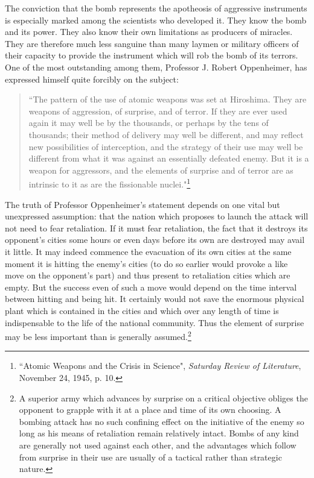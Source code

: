The conviction that the bomb represents the apotheosis of aggressive instruments is especially marked among the scientists who developed it. They know the bomb and its power. They also know their own limitations as producers of miracles. They are therefore much less sanguine than many laymen or military officers of their capacity to provide the instrument which will rob the bomb of its terrors. One of the most outstanding among them, Professor J. Robert Oppenheimer, has expressed himself quite forcibly on the subject:

\begin{quote}
``The pattern of the use of atomic weapons was set at Hiroshima. They are weapons of aggression, of surprise, and of terror. If they are ever used again it may well be by the thousands, or perhaps by the tens of thousands; their method of delivery may well be different, and may reflect new possibilities of interception, and the strategy of their use may well be different from what it was against an essentially defeated enemy. But it is a weapon for aggressors, and the elements of surprise and of terror are as intrinsic to it as are the fissionable nuclei."\footnote{``Atomic Weapons and the Crisis in Science", \textit{Saturday Review of Literature}, November 24, 1945, p. 10.}
\end{quote}

The truth of Professor Oppenheimer's statement depends on one vital but unexpressed assumption: that the nation which proposes to launch the attack will not need to fear retaliation. If it must fear retaliation, the fact that it destroys its opponent's cities some hours or even days before its own are destroyed may avail it little. It may indeed commence the evacuation of its own cities at the same moment it is hitting the enemy's cities (to do so earlier would provoke a like move on the opponent's part) and thus present to retaliation cities which are empty. But the success even of such a move would depend on the time interval between hitting and being hit. It certainly would not save the enormous physical plant which is contained in the cities and which over any length of time is indispensable to the life of the national community. Thus the element of surprise may be less important than is generally assumed.\footnote{A superior army which advances by surprise on a critical objective obliges the opponent to grapple with it at a place and time of its own choosing. A bombing attack has no such confining effect on the initiative of the enemy so long as his means of retaliation remain relatively intact. Bombs of any kind are generally not used against each other, and the advantages which follow from surprise in their use are usually of a tactical rather than strategic nature.}

